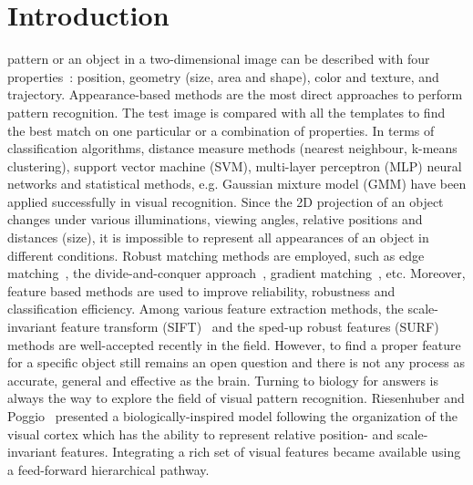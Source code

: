 \documentclass[journal]{journal}
\begin{document}
\section{Introduction}
 pattern or an object in a two-dimensional image can be described with four properties~\cite{wysoski2008fast}: position, geometry (size, area and shape), color and texture, and trajectory. Appearance-based methods are the most direct approaches to perform pattern recognition. 
The test image is compared with all the templates to find the best match on one particular or a combination of properties. 
In terms of classification algorithms, distance measure methods (nearest neighbour, k-means clustering), support vector machine (SVM), multi-layer perceptron (MLP) neural networks and statistical methods, e.g. Gaussian mixture model (GMM) have been applied successfully in visual recognition. 
Since the 2D projection of an object changes under various illuminations, viewing angles, relative positions and distances (size), it is impossible to represent all appearances of an object in different conditions. 
Robust matching methods are employed, such as edge matching~\cite{canny1986computational}, the divide-and-conquer approach~\cite{toygar2004multiple}, gradient matching~\cite{wei2006robust}, etc. 
Moreover, feature based methods are used to improve reliability, robustness and classification efficiency. 
Among various feature extraction methods, the scale-invariant feature transform (SIFT)~\cite{lowe2004distinctive} and the sped-up robust features (SURF)~\cite{bay2008speeded} methods are well-accepted recently in the field. 
However, to find a proper feature for a specific object still remains an open question and there is not any process as accurate, general and effective as the brain.
Turning to biology for answers is always the way to explore the field of visual pattern recognition. 
Riesenhuber and Poggio~\cite{riesenhuber1999hierarchical} presented a biologically-inspired model following the organization of the visual cortex which has the ability to represent relative position- and scale-invariant features. Integrating a rich set of visual features became available using a feed-forward hierarchical pathway. 
\end{document}
